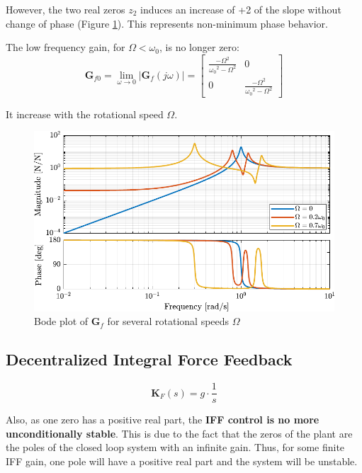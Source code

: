 \documentclass{ISMA_USD2020}
\begin{document}
However, the two real zeros \(z_2\) induces an increase of +2 of the slope without change of phase (Figure \ref{fig:plant_iff_compare_rotating_speed}).
This represents non-minimum phase behavior.


The low frequency gain, for \(\Omega < \omega_0\), is no longer zero:
\begin{equation}
\label{low_freq_gain_iff_plan}
  \bm{G}_{f0} = \lim_{\omega \to 0} \left| \bm{G}_f (j\omega) \right| = \begin{bmatrix}
  \frac{- \Omega^2}{{\omega_0}^2 - \Omega^2} & 0 \\
  0  & \frac{- \Omega^2}{{\omega_0}^2 - \Omega^2}
\end{bmatrix}
\end{equation}

It increase with the rotational speed \(\Omega\).

\begin{figure}[htbp]
\centering
\includegraphics[scale=1]{figs/plant_iff_compare_rotating_speed.pdf}
\caption{\label{fig:plant_iff_compare_rotating_speed}Bode plot of \(\bm{G}_f\) for several rotational speeds \(\Omega\)}
\end{figure}

\subsection{Decentralized Integral Force Feedback}
\label{sec:orge1a14b4}

\begin{equation}
  \bm{K}_F(s) = g \cdot \frac{1}{s}
\end{equation}

Also, as one zero has a positive real part, the \textbf{IFF control is no more unconditionally stable}.
This is due to the fact that the zeros of the plant are the poles of the closed loop system with an infinite gain.
Thus, for some finite IFF gain, one pole will have a positive real part and the system will be unstable.
\end{document}
